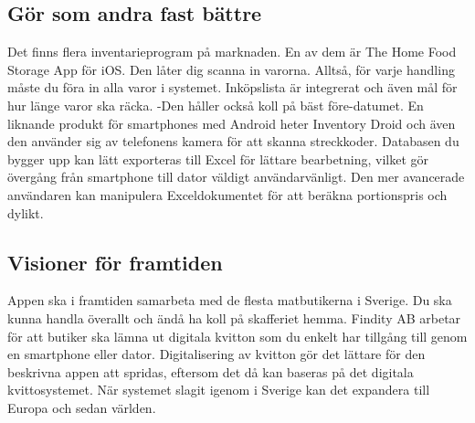 \documentclass[12pt, a4paper]{article}
\begin{document}
\subsection{Gör som andra fast bättre}
Det finns flera inventarieprogram på marknaden. En av dem är The Home Food Storage App för iOS. Den låter dig scanna in varorna. Alltså, för varje handling måste du föra in alla varor i systemet. Inköpslista är integrerat och även mål för hur länge varor ska räcka. -Den håller också koll på bäst före-datumet.\cite{FoodStorageApp} 
\noindent \newline \newline
En liknande produkt för smartphones med Android heter Inventory Droid och även den använder sig av telefonens kamera för att skanna streckkoder. Databasen du bygger upp kan lätt exporteras till Excel för lättare bearbetning, vilket gör övergång från smartphone till dator väldigt användarvänligt. Den mer avancerade användaren kan manipulera Exceldokumentet för att beräkna portionspris och dylikt.\cite{InventoryDroid} 


\subsection{Visioner för framtiden}
Appen ska i framtiden samarbeta med de flesta matbutikerna i Sverige. Du ska kunna handla överallt och ändå ha koll på skafferiet hemma. 
\noindent \newline \newline
Findity AB arbetar för att butiker ska lämna ut digitala kvitton som du enkelt har tillgång till genom en smartphone eller dator.\cite{SparaKvittot} Digitalisering av kvitton gör det lättare för den beskrivna appen att spridas, eftersom det då kan baseras på det digitala kvittosystemet.
\noindent \newline \newline
När systemet slagit igenom i Sverige kan det expandera till Europa och sedan världen.            

\pagebreak
\end{document}
